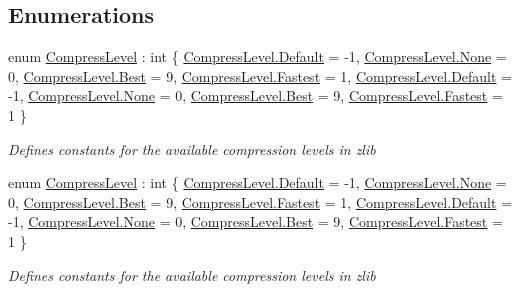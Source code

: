\subsection*{Enumerations}
\begin{DoxyCompactItemize}
\item 
enum \hyperlink{namespace_dot_z_lib_a034f7a1ef9856d8834e6f6b1c53d8a4c}{Compress\+Level} \+: int \{ \newline
\hyperlink{namespace_dot_z_lib_a034f7a1ef9856d8834e6f6b1c53d8a4ca7a1920d61156abc05a60135aefe8bc67}{Compress\+Level.\+Default} = -\/1, 
\hyperlink{namespace_dot_z_lib_a034f7a1ef9856d8834e6f6b1c53d8a4ca6adf97f83acf6453d4a6a4b1070f3754}{Compress\+Level.\+None} = 0, 
\hyperlink{namespace_dot_z_lib_a034f7a1ef9856d8834e6f6b1c53d8a4ca68ef004de6166492c1d668eb8efe09bd}{Compress\+Level.\+Best} = 9, 
\hyperlink{namespace_dot_z_lib_a034f7a1ef9856d8834e6f6b1c53d8a4ca90fd7fdf6f41406a75e5265b9583bb4e}{Compress\+Level.\+Fastest} = 1, 
\newline
\hyperlink{namespace_dot_z_lib_a034f7a1ef9856d8834e6f6b1c53d8a4ca7a1920d61156abc05a60135aefe8bc67}{Compress\+Level.\+Default} = -\/1, 
\hyperlink{namespace_dot_z_lib_a034f7a1ef9856d8834e6f6b1c53d8a4ca6adf97f83acf6453d4a6a4b1070f3754}{Compress\+Level.\+None} = 0, 
\hyperlink{namespace_dot_z_lib_a034f7a1ef9856d8834e6f6b1c53d8a4ca68ef004de6166492c1d668eb8efe09bd}{Compress\+Level.\+Best} = 9, 
\hyperlink{namespace_dot_z_lib_a034f7a1ef9856d8834e6f6b1c53d8a4ca90fd7fdf6f41406a75e5265b9583bb4e}{Compress\+Level.\+Fastest} = 1
 \}\begin{DoxyCompactList}\small\item\em Defines constants for the available compression levels in zlib \end{DoxyCompactList}
\item 
enum \hyperlink{namespace_dot_z_lib_a034f7a1ef9856d8834e6f6b1c53d8a4c}{Compress\+Level} \+: int \{ \newline
\hyperlink{namespace_dot_z_lib_a034f7a1ef9856d8834e6f6b1c53d8a4ca7a1920d61156abc05a60135aefe8bc67}{Compress\+Level.\+Default} = -\/1, 
\hyperlink{namespace_dot_z_lib_a034f7a1ef9856d8834e6f6b1c53d8a4ca6adf97f83acf6453d4a6a4b1070f3754}{Compress\+Level.\+None} = 0, 
\hyperlink{namespace_dot_z_lib_a034f7a1ef9856d8834e6f6b1c53d8a4ca68ef004de6166492c1d668eb8efe09bd}{Compress\+Level.\+Best} = 9, 
\hyperlink{namespace_dot_z_lib_a034f7a1ef9856d8834e6f6b1c53d8a4ca90fd7fdf6f41406a75e5265b9583bb4e}{Compress\+Level.\+Fastest} = 1, 
\newline
\hyperlink{namespace_dot_z_lib_a034f7a1ef9856d8834e6f6b1c53d8a4ca7a1920d61156abc05a60135aefe8bc67}{Compress\+Level.\+Default} = -\/1, 
\hyperlink{namespace_dot_z_lib_a034f7a1ef9856d8834e6f6b1c53d8a4ca6adf97f83acf6453d4a6a4b1070f3754}{Compress\+Level.\+None} = 0, 
\hyperlink{namespace_dot_z_lib_a034f7a1ef9856d8834e6f6b1c53d8a4ca68ef004de6166492c1d668eb8efe09bd}{Compress\+Level.\+Best} = 9, 
\hyperlink{namespace_dot_z_lib_a034f7a1ef9856d8834e6f6b1c53d8a4ca90fd7fdf6f41406a75e5265b9583bb4e}{Compress\+Level.\+Fastest} = 1
 \}\begin{DoxyCompactList}\small\item\em Defines constants for the available compression levels in zlib \end{DoxyCompactList}
\end{DoxyCompactItemize}

